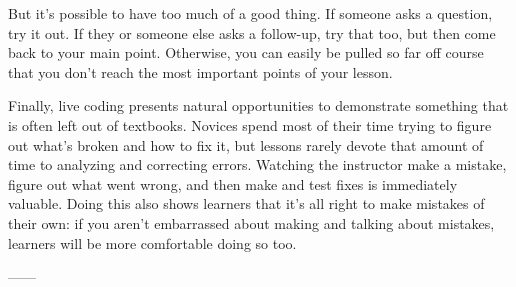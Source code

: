 But it's possible to have too much of a good thing.
If someone asks a question, try it out.
If they or someone else asks a follow-up,
try that too,
but then come back to your main point.
Otherwise,
you can easily be pulled so far off course that
you don't reach the most important points of your lesson.

Finally,
live coding presents natural opportunities to demonstrate something that is often left out of textbooks.
Novices spend most of their time trying to figure out what's broken and how to fix it,
but lessons rarely devote that amount of time to analyzing and correcting errors.
Watching the instructor make a mistake,
figure out what went wrong,
and then make and test fixes is immediately valuable.
Doing this also shows learners that it's all right to make mistakes of their own:
if you aren't embarrassed about making and talking about mistakes,
learners will be more comfortable doing so too.

------


